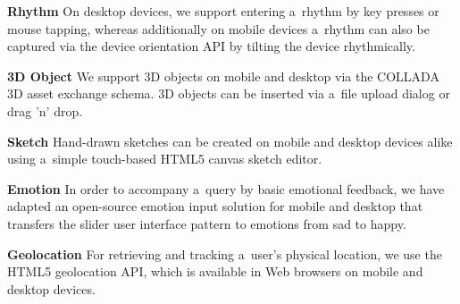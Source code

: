 \documentclass{acm_proc_article-sp}
\begin{document}
\textbf{Rhythm}
On desktop devices, we support entering a~rhythm by key presses or mouse tapping, whereas additionally on mobile devices a~rhythm can also be captured via the device orientation API by tilting the device rhythmically.

\textbf{3D Object}
We support 3D objects on mobile and desktop via the COLLADA 3D asset exchange schema.
3D objects can be inserted via a~file upload dialog or drag 'n' drop. 

\textbf{Sketch}
Hand-drawn sketches can be created on mobile and desktop devices alike using a~simple touch-based HTML5 canvas sketch editor.

\textbf{Emotion}
In order to accompany a~query by basic emotional feedback, we have adapted an open-source emotion input solution for mobile and desktop that transfers the slider user interface pattern to emotions from sad to happy. 

\textbf{Geolocation}
For retrieving and tracking a~user's physical location, we use the HTML5 geolocation API, which is available in Web browsers on mobile and desktop devices.

\balancecolumns
\end{document}
